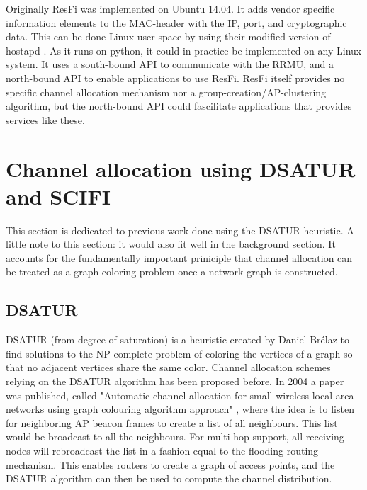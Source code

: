Originally ResFi was implemented on Ubuntu 14.04. It adds vendor specific information elements to the MAC-header with the IP, port, and cryptographic data. This can be done Linux user space by using their modified version of hostapd \cite{resfigit}.
As it runs on python, it could in practice be implemented on any Linux system. It uses a south-bound API to communicate with the RRMU, and a north-bound API to enable applications to use ResFi. ResFi itself provides no specific channel allocation mechanism nor a group-creation/AP-clustering algorithm, but the north-bound API could fascilitate applications that provides services like these.


\section{Channel allocation using DSATUR and SCIFI} 
This section is dedicated to previous work done using the DSATUR heuristic. A little note to this section: it would also fit well in the background section. It accounts for the fundamentally important priniciple that
channel allocation can be treated as a graph coloring problem once a network graph is constructed.  

\subsection{DSATUR}
DSATUR (from degree of saturation) is a heuristic created by Daniel Brélaz \cite{Brelaz} to find solutions to the NP-complete problem of coloring the vertices of a graph so that no adjacent vertices share the same color. 
Channel allocation schemes relying on the DSATUR algorithm has been proposed before. In 2004 a paper was published, called
"Automatic channel allocation for small wireless local area networks using graph colouring algorithm approach" \cite{mahonen}, where the idea is to listen for neighboring AP beacon frames to create a list of all neighbours.
This list would be broadcast to all the neighbours. For multi-hop support, all receiving nodes will rebroadcast the list in a fashion equal to the flooding routing mechanism. This enables routers to create a graph of access points, and the DSATUR algorithm can then be used to compute the channel distribution. 

